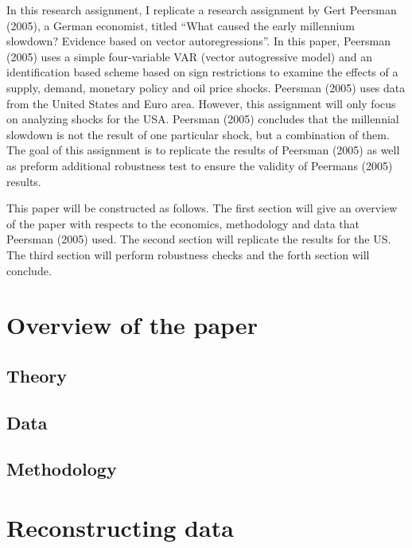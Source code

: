 \documentclass[11pt,preprint, authoryear]{elsarticle}
\numberwithin{equation}{section}
\numberwithin{figure}{section}
\numberwithin{table}{section}
\begin{document}
In this research assignment, I replicate a research assignment by Gert
Peersman (2005), a German economist, titled ``What caused the early
millennium slowdown? Evidence based on vector autoregressions''. In this
paper, Peersman (2005) uses a simple four-variable VAR (vector
autogressive model) and an identification based scheme based on sign
restrictions to examine the effects of a supply, demand, monetary policy
and oil price shocks. Peersman (2005) uses data from the United States
and Euro area. However, this assignment will only focus on analyzing
shocks for the USA. Peersman (2005) concludes that the millennial
slowdown is not the result of one particular shock, but a combination of
them. The goal of this assignment is to replicate the results of
Peersman (2005) as well as preform additional robustness test to ensure
the validity of Peermans (2005) results.

This paper will be constructed as follows. The first section will give
an overview of the paper with respects to the economics, methodology and
data that Peersman (2005) used. The second section will replicate the
results for the US. The third section will perform robustness checks and
the forth section will conclude.

\hypertarget{overview-of-the-paper}{%
\section{Overview of the paper}\label{overview-of-the-paper}}

\hypertarget{theory}{%
\subsection{Theory}\label{theory}}

\hypertarget{data}{%
\subsection{Data}\label{data}}

\hypertarget{methodology}{%
\subsection{Methodology}\label{methodology}}

\hypertarget{reconstructing-data}{%
\section{Reconstructing data}\label{reconstructing-data}}
\end{document}
